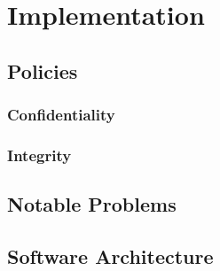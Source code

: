 \chapter{Implementation}


\section{Policies}


\subsection{Confidentiality}


\subsection{Integrity}


\section{Notable Problems}


\section{Software Architecture}

